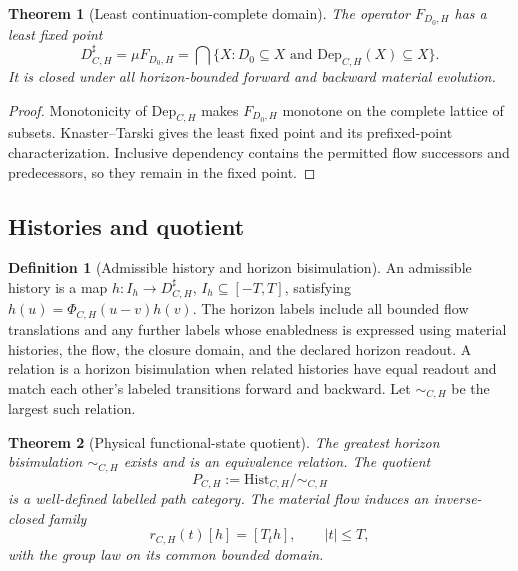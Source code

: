 \documentclass[11pt]{article}
\newtheorem{theorem}{Theorem}
\theoremstyle{definition}
\newtheorem{definition}{Definition}
\begin{document}
\begin{theorem}[Least continuation-complete domain]
\label{thm:least-continuation-complete-domain}
The operator $F_{D_0,H}$ has a least fixed point
\begin{equation}
D^{\sharp}_{C,H} = \mu F_{D_0,H} = \bigcap \{X : D_0 \subseteq X \text{ and } \mathrm{Dep}_{C,H}(X) \subseteq X\}. \tag{S6}
\end{equation}
It is closed under all horizon-bounded forward and backward material evolution.
\end{theorem}

\begin{proof}
Monotonicity of $\mathrm{Dep}_{C,H}$ makes $F_{D_0,H}$ monotone on the complete lattice of subsets. Knaster--Tarski gives the least fixed point and its prefixed-point characterization. Inclusive dependency contains the permitted flow successors and predecessors, so they remain in the fixed point.
\end{proof}

\subsection{Histories and quotient}

\begin{definition}[Admissible history and horizon bisimulation]
An admissible history is a map $h : I_h \to D^{\sharp}_{C,H}$, $I_h \subseteq [-T, T]$, satisfying $h(u) = \Phi_{C,H}(u - v)h(v)$. The horizon labels include all bounded flow translations and any further labels whose enabledness is expressed using material histories, the flow, the closure domain, and the declared horizon readout. A relation is a horizon bisimulation when related histories have equal readout and match each other's labeled transitions forward and backward. Let $\sim_{C,H}$ be the largest such relation.
\end{definition}

\begin{theorem}[Physical functional-state quotient]
\label{thm:physical-functional-quotient}
The greatest horizon bisimulation $\sim_{C,H}$ exists and is an equivalence relation. The quotient
\begin{equation}
P_{C,H} := \mathrm{Hist}_{C,H} / \sim_{C,H} \tag{S7}
\end{equation}
is a well-defined labelled path category. The material flow induces an inverse-closed family
\begin{equation}
r_{C,H}(t)[h] = [T_t h], \qquad |t| \leq T, \tag{S8}
\end{equation}
with the group law on its common bounded domain.
\end{theorem}
\end{document}
